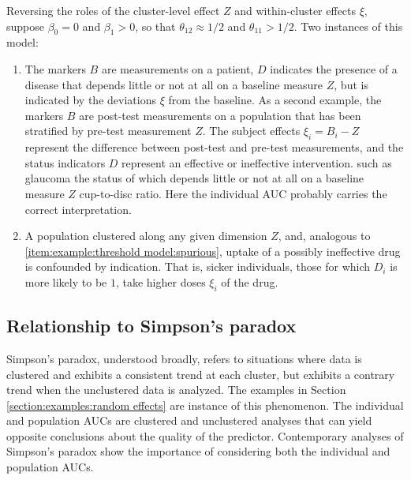 \documentclass[12pt]{article}
\DeclareMathOperator{\AUC}{AUC}
\newcommand{\cind}{\perp \!\!\! \perp}
\newcommand{\aucindiv}{\theta_{11}}%
\newcommand{\aucpop}{\theta_{12}}%
\newcommand{\comment}[1]{
  \iftoggle{commenttoggle}{
    {\normalsize{\color{red}{ #1}}\normalsize}
  }
  {}
}
\begin{document}
Reversing the roles of the cluster-level effect $Z$ and within-cluster
effects $\xi$, suppose $\beta_0=0$ and $\beta_1>0$, so that $\aucpop\approx 1/2$ and
$\aucindiv>1/2$. Two instances of this model:
\begin{enumerate}[resume,label=(\alph*)]
\item  The markers $B$ are measurements on a patient, 
$D$ indicates the presence of
a disease that depends little or not at all on a baseline measure $Z$, but is indicated by the deviations $\xi$ from the
baseline.  As a second example, the markers $B$ are post-test measurements on a population that has been stratified by pre-test measurement $Z$. The subject effects $\xi_i=B_i-Z$ represent the difference between post-test and pre-test measurements, and the status indicators $D$ represent an effective or ineffective intervention.
such as glaucoma the status of which depends little or not
at all on a baseline measure $Z$ 
cup-to-disc ratio. Here the individual AUC probably carries the correct interpretation.
\item A population clustered along any given dimension $Z$, and, analogous to \ref{item:example:threshold model:spurious}, uptake of a possibly ineffective drug is confounded by indication. That is, sicker individuals, those for which $D_i$ is more likely to be $1$, take higher doses $\xi_i$ of the drug.
\end{enumerate}

\subsection{Relationship to Simpson's paradox}
Simpson's paradox, understood broadly, refers to situations where data
is clustered and exhibits a consistent trend at each cluster, but
exhibits a contrary trend when the unclustered data is analyzed. The
examples in Section \ref{section:examples:random effects} are instance of this
phenomenon. The individual and population AUCs are clustered and
unclustered analyses that can yield opposite conclusions about the quality
of the predictor. Contemporary analyses of Simpson's paradox show the importance of considering both the individual and population AUCs.
\end{document}
